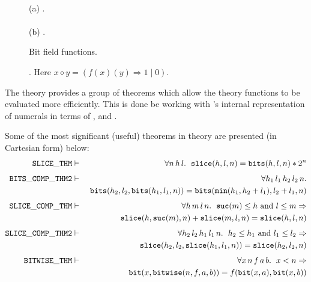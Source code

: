\begin{figure}
\begin{center}
 \\[3mm]
(a) . \\[6mm]
 \\[3mm]
(b) .
\end{center}
\caption{Bit field functions.\label{bits-slice}}
\end{figure}

\begin{figure}
\begin{center}

\end{center}
\caption{. Here $x\diamond y = (f(x)(y) \Rightarrow 1 \mid 0)$.\label{bitwise}}
\end{figure}

The  theory provides a group of theorems which allow the  theory functions to be evaluated more efficiently.
This is done be working with \HOL's internal representation of numerals \ie{} in terms of ,  and .

Some of the most significant (useful) theorems in  theory are presented (in Cartesian form) below:
\begin{eqnarray*}
\mathtt{SLICE\_THM} & \vdash & \forall n\,h\,l.\ \;\mathtt{slice}(h,l,n) = \mathtt{bits}(h,l,n) * 2^n \\[4pt]
\mathtt{BITS\_COMP\_THM2} & \vdash & \forall h_1\,l_1\,h_2\,l_2\,n.\\*
&& \ \mathtt{bits}(h_2,l_2,\mathtt{bits}(h_1,l_1,n)) = \mathtt{bits}(\mathtt{min}(h_1,h_2 + l_1),l_2 + l_1,n) \\[4pt]
\mathtt{SLICE\_COMP\_THM} & \vdash &
   \forall h\,m\,l\,n.\ \;\mathtt{suc}(m) \leq h \mbox{ and } l \leq m \Rightarrow \\*
&& \quad \mathtt{slice}(h,\mathtt{suc}(m),n) + \mathtt{slice}(m,l,n) = \mathtt{slice}(h,l,n) \\[4pt]
\mathtt{SLICE\_COMP\_THM2} & \vdash &
   \forall h_2\,l_2\,h_1\,l_1\,n.\ \; h_2 \leq h_1 \mbox{ and } l_1 \leq l_2 \Rightarrow \\*
&& \quad \mathtt{slice}(h_2,l_2,\mathtt{slice}(h_1,l_1,n)) = \mathtt{slice}(h_2,l_2,n) \\[4pt]
\mathtt{BITWISE\_THM} & \vdash &
   \forall x\,n\,f\,a\,b.\ \;
        x < n \Rightarrow \\*
&& \quad \mathtt{bit}(x,\mathtt{bitwise}(n,f,a,b)) = f(\mathtt{bit}(x,a),\mathtt{bit}(x,b))
\end{eqnarray*}

